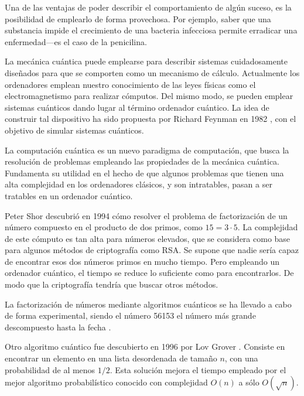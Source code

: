 Una de las ventajas de poder describir el comportamiento de algún suceso, es la 
posibilidad de emplearlo de forma provechosa. Por ejemplo, saber que una 
substancia impide el crecimiento de una bacteria infecciosa permite erradicar 
una enfermedad---es el caso de la penicilina.

La mecánica cuántica puede emplearse para describir sistemas cuidadosamente 
diseñados para que se comporten como un mecanismo de cálculo. Actualmente los 
ordenadores emplean nuestro conocimiento de las leyes físicas como el 
electromagnetismo para realizar cómputos. Del mismo modo, se pueden emplear 
sistemas cuánticos dando lugar al término ordenador cuántico. La idea de 
construir tal dispositivo ha sido propuesta por Richard Feynman en 1982 
\cite{feynman-sim}, con el objetivo de simular sistemas cuánticos.

La computación cuántica es un nuevo paradigma de computación, que busca la
resolución de problemas empleando las propiedades de la mecánica cuántica.
Fundamenta su utilidad en el hecho de que algunos problemas que tienen una alta
complejidad en los ordenadores clásicos, y son intratables, pasan a ser
tratables en un ordenador cuántico.

Peter Shor descubrió en 1994 \cite{shor97} cómo resolver el problema de 
factorización de un número compuesto en el producto de dos primos, como $15 = 
3\cdot5$. La complejidad de este cómputo es tan alta para números elevados, que 
se considera como base para algunos métodos de criptografía como RSA. Se supone 
que nadie sería capaz de encontrar esos dos números primos en mucho tiempo. Pero 
empleando un ordenador cuántico, el tiempo se reduce lo suficiente como para 
encontrarlos. De modo que la criptografía tendría que buscar otros métodos.

La factorización de números mediante algoritmos cuánticos se ha llevado a cabo 
de forma experimental, siendo el número 56153 el número más grande descompuesto 
hasta la fecha \cite{factor}. 

Otro algoritmo cuántico fue descubierto en 1996 por Lov Grover \cite{grover96}.  
Consiste en encontrar un elemento en una lista desordenada de tamaño $n$, con 
una probabilidad de al menos $1/2$. Esta solución mejora el tiempo empleado por 
el mejor algoritmo probabilístico conocido con complejidad $O(n)$ a sólo 
$O(\sqrt{n})$.

